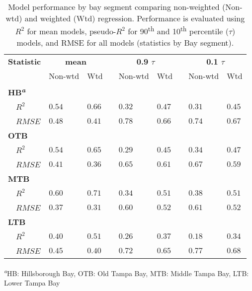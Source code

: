 \documentclass{svjour3}\usepackage[]{graphicx}\usepackage[]{color}
\newcommand{\ten}{10\textsuperscript{th} percentile }
\begin{document}
%
\begin{table}[!tbp]
\caption{Model performance by bay segment comparing non-weighted (Non-wtd) and weighted (Wtd) regression.  Performance is evaluated using $R^2$ for mean models, pseudo-$R^2$ for 90\textsuperscript{th} and \ten ($\tau$) models, and \ac{RMSE} for all models (statistics by Bay segment).\label{tab:modperf}} 
\begin{center}
\begin{tabular}{lllcllcll}
\hline\hline
\multicolumn{1}{l}{\bfseries Statistic}&\multicolumn{2}{c}{\bfseries mean}&\multicolumn{1}{c}{\bfseries }&\multicolumn{2}{c}{\bfseries 0.9 $\tau$}&\multicolumn{1}{c}{\bfseries }&\multicolumn{2}{c}{\bfseries 0.1 $\tau$}\tabularnewline
\cline{2-3} \cline{5-6} \cline{8-9}
\multicolumn{1}{l}{}&\multicolumn{1}{c}{Non-wtd}&\multicolumn{1}{c}{Wtd}&\multicolumn{1}{c}{}&\multicolumn{1}{c}{Non-wtd}&\multicolumn{1}{c}{Wtd}&\multicolumn{1}{c}{}&\multicolumn{1}{c}{Non-wtd}&\multicolumn{1}{c}{Wtd}\tabularnewline
\hline
{\bfseries HB\textsuperscript{\textit{a}}}&&&&&&&&\tabularnewline
~~$R^2$&$0.54$&$0.66$&&$0.32$&$0.47$&&$0.31$&$0.45$\tabularnewline
~~$RMSE$&$0.48$&$0.41$&&$0.78$&$0.66$&&$0.74$&$0.67$\tabularnewline
\hline
{\bfseries OTB}&&&&&&&&\tabularnewline
~~$R^2$&$0.54$&$0.65$&&$0.29$&$0.45$&&$0.34$&$0.47$\tabularnewline
~~$RMSE$&$0.41$&$0.36$&&$0.65$&$0.61$&&$0.67$&$0.59$\tabularnewline
\hline
{\bfseries MTB}&&&&&&&&\tabularnewline
~~$R^2$&$0.60$&$0.71$&&$0.34$&$0.51$&&$0.38$&$0.51$\tabularnewline
~~$RMSE$&$0.37$&$0.31$&&$0.60$&$0.52$&&$0.61$&$0.52$\tabularnewline
\hline
{\bfseries LTB}&&&&&&&&\tabularnewline
~~$R^2$&$0.40$&$0.51$&&$0.26$&$0.37$&&$0.18$&$0.34$\tabularnewline
~~$RMSE$&$0.45$&$0.40$&&$0.72$&$0.65$&&$0.77$&$0.68$\tabularnewline
\hline
\end{tabular}
\end{center}
\footnotesize \textsuperscript{\textit{a}}HB: Hillsborough Bay, OTB: Old Tampa Bay, MTB: Middle Tampa Bay, LTB: Lower Tampa Bay\end{table}
\end{document}
